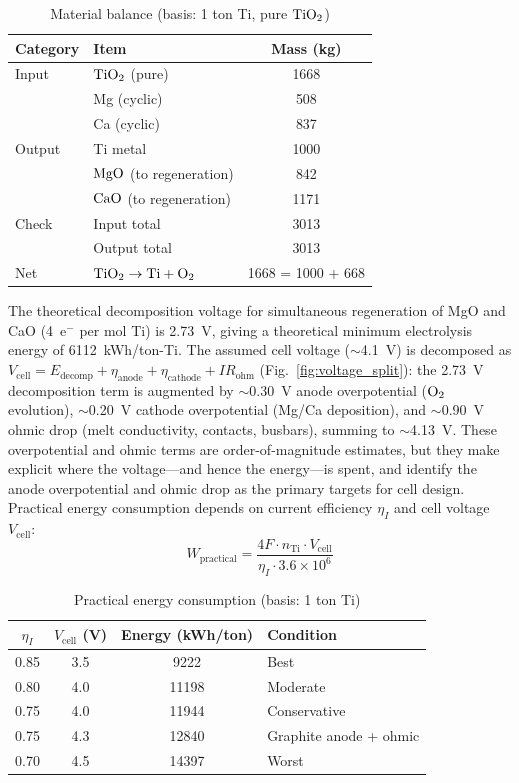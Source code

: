 \documentclass[sn-mathphys,Numbered]{sn-jnl}
\begin{document}
\begin{table}[!ht]
\centering
\footnotesize
\caption{Material balance (basis: 1 ton Ti, pure $\ce{TiO2}$)}
\label{tab:mbalance}
\begin{tabular}{llc}
\toprule
Category & Item & Mass (kg) \\
\midrule
Input & $\ce{TiO2}$ (pure) & 1668 \\
 & Mg (cyclic) & 508 \\
 & Ca (cyclic) & 837 \\
\midrule
Output & Ti metal & 1000 \\
 & $\ce{MgO}$ (to regeneration) & 842 \\
 & $\ce{CaO}$ (to regeneration) & 1171 \\
\midrule
Check & Input total & 3013 \\
 & Output total & 3013 \\
\midrule
Net & $\ce{TiO2} \to \ce{Ti} + \ce{O2}$ & 1668 = 1000 + 668 \\
\bottomrule
\end{tabular}
\end{table}

The theoretical decomposition voltage for simultaneous regeneration of MgO and CaO (4~e$^-$ per mol Ti) is 2.73~V, giving a theoretical minimum electrolysis energy of 6112~kWh/ton-Ti. The assumed cell voltage ($\sim$4.1~V) is decomposed as $V_{\mathrm{cell}} = E_{\mathrm{decomp}} + \eta_{\mathrm{anode}} + \eta_{\mathrm{cathode}} + IR_{\mathrm{ohm}}$ (Fig.~\ref{fig:voltage_split}): the 2.73~V decomposition term is augmented by $\sim$0.30~V anode overpotential ($\ce{O2}$ evolution), $\sim$0.20~V cathode overpotential (Mg/Ca deposition), and $\sim$0.90~V ohmic drop (melt conductivity, contacts, busbars), summing to $\sim$4.13~V. These overpotential and ohmic terms are order-of-magnitude estimates, but they make explicit where the voltage---and hence the energy---is spent, and identify the anode overpotential and ohmic drop as the primary targets for cell design. Practical energy consumption depends on current efficiency $\eta_I$ and cell voltage $V_{\mathrm{cell}}$:
\begin{equation}
W_{\mathrm{practical}} = \frac{4F \cdot n_{\mathrm{Ti}} \cdot V_{\mathrm{cell}}}{\eta_I \cdot 3.6\times10^{6}}
\end{equation}

\begin{table}[!ht]
\centering
\footnotesize
\caption{Practical energy consumption (basis: 1 ton Ti)}
\label{tab:energy}
\begin{tabular}{cccl}
\toprule
$\eta_I$ & $V_{\mathrm{cell}}$ (V) & Energy (kWh/ton) & Condition \\
\midrule
0.85 & 3.5 & 9222 & Best \\
0.80 & 4.0 & 11198 & Moderate \\
0.75 & 4.0 & 11944 & Conservative \\
0.75 & 4.3 & 12840 & Graphite anode + ohmic \\
0.70 & 4.5 & 14397 & Worst \\
\bottomrule
\end{tabular}
\end{table}
\end{document}

